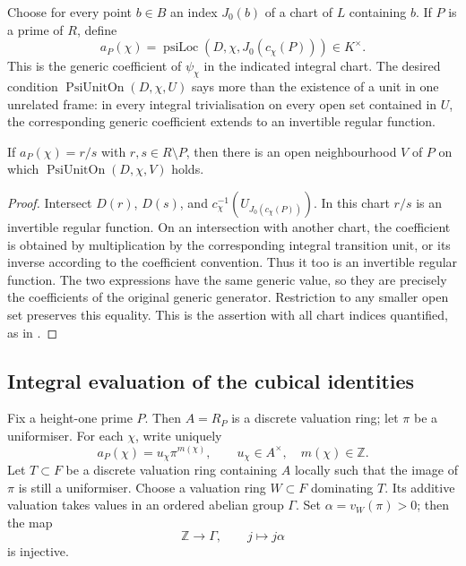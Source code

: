 Choose for every point \(b\in B\) an index \(J_0(b)\) of a chart of
\(L\) containing \(b\).  If \(P\) is a prime of \(R\), define
\[
 a_P(\chi)=\operatorname{psiLoc}(D,\chi,J_0(c_\chi(P)))\in K^\times.
 \tag{PU1}\label{eq:psi-local-coefficient}
\]
This is the generic coefficient of \(\psi_\chi\) in the indicated
integral chart.  The desired condition
\(\operatorname{PsiUnitOn}(D,\chi,U)\) says more than the existence of a
unit in one unrelated frame: in every integral trivialisation on every
open set contained in \(U\), the corresponding generic coefficient
extends to an invertible regular function.

\begin{srlemma}
\label{lem:psi-near-unit}
If \(a_P(\chi)=r/s\) with \(r,s\in R\setminus P\), then there is an
open neighbourhood \(V\) of \(P\) on which
\(\operatorname{PsiUnitOn}(D,\chi,V)\) holds.
\end{srlemma}
\begin{proof}
Intersect \(D(r)\), \(D(s)\), and
\(c_\chi^{-1}(U_{J_0(c_\chi(P))})\).  In this chart \(r/s\) is an
invertible regular function.  On an intersection with another chart,
the coefficient is obtained by multiplication by the corresponding
integral transition unit, or its inverse according to the coefficient
convention.  Thus it too is an invertible regular function.
The two expressions have the same generic value, so they are precisely
the coefficients of the original generic generator.
Restriction to any smaller open set preserves this equality.  This is
the assertion with all chart indices quantified, as in
.
\end{proof}

\subsection{Integral evaluation of the cubical identities}
Fix a height-one prime \(P\).  Then \(A=R_P\) is a discrete valuation
ring; let \(\pi\) be a uniformiser.  For each \(\chi\), write uniquely
\[
             a_P(\chi)=u_\chi\pi^{m(\chi)},\qquad
             u_\chi\in A^\times,\quad m(\chi)\in\mathbb Z .
 \tag{PU2}\label{eq:psi-valuations}
\]
Let \(T\subset F\) be a discrete valuation ring containing \(A\) locally
such that the image of \(\pi\) is still a uniformiser.
Choose a valuation ring \(W\subset F\) dominating \(T\).  Its additive
valuation takes values in an ordered abelian group \(\Gamma\).
Set \(\alpha=v_W(\pi)>0\); then the map
\[
                   \mathbb Z\longrightarrow\Gamma,\qquad
                   j\longmapsto j\alpha
 \tag{PU3}\label{eq:psi-injective-value}
\]
is injective.

